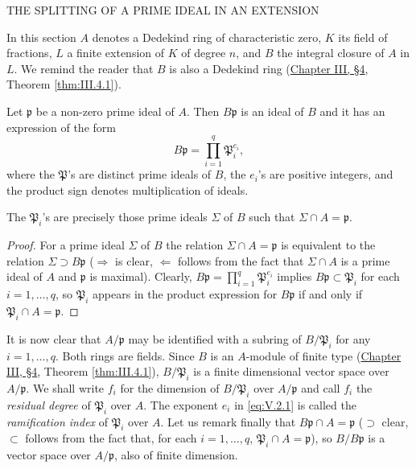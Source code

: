 %
        {THE SPLITTING OF A PRIME IDEAL IN AN EXTENSION}

In this section $A$ denotes a Dedekind ring of characteristic zero, $K$ its
field of fractions, $L$ a finite extension of $K$ of degree $n$, and $B$ the
integral closure of $A$ in $L$. We remind the reader that $B$ is also a
Dedekind ring (\hyperref[sec:3.4]{Chapter III, §4}, Theorem \ref{thm:III.4.1}).

Let $\mathfrak{p}$ be a non-zero prime ideal of $A$. Then
$B\mathfrak{p}$ is an ideal of $B$ and it has an expression of the form
\begin{equation}
B\mathfrak{p}=\prod_{i=1}^{q}\mathfrak{P}_{i}^{e_{i}},
\label{eq:V.2.1}
\end{equation}
where the $\mathfrak{P}$'s are distinct prime ideals of $B$, the $e_{i}$'s
are positive integers, and the product sign denotes multiplication of
ideals.

\begin{proposition}
\label{prop:V.2.1}
The $\mathfrak{P}_{i}$'s are precisely those prime ideals $\Sigma$ of $B$
such that $\Sigma\cap A=\mathfrak{p}$.
\end{proposition}

\begin{proof}
For a prime ideal $\Sigma$ of $B$ the relation $\Sigma\cap A=\mathfrak{p}$
is equivalent to the relation $\Sigma\supset B\mathfrak{p}$
($\Rightarrow$ is clear, $\Leftarrow$ follows from the fact that
$\Sigma\cap A$ is a prime ideal of $A$ and $\mathfrak{p}$ is maximal).
Clearly, $B\mathfrak{p}=\prod_{i=1}^{q}\mathfrak{P}_{i}^{e_{i}}$ implies
$B\mathfrak{p}\subset\mathfrak{P}_{i}$ for each $i=1,\ldots,q$, so
$\mathfrak{P}_{i}$ appears in the product expression for $B\mathfrak{p}$ if
and only if $\mathfrak{P}_{i}\cap A=\mathfrak{p}$.
\end{proof}

It is now clear that $A/\mathfrak{p}$ may be identified with a subring of
$B/\mathfrak{P}_{i}$ for any $i=1,\ldots,q$. Both rings are fields. Since $B$
is an $A$-module of finite type (\hyperref[sec:3.4]{Chapter III, §4}, Theorem
\ref{thm:III.4.1}), $B/\mathfrak{P}_{i}$ is a finite dimensional vector
space over $A/\mathfrak{p}$. We shall write $f_{i}$ for the dimension of
$B/\mathfrak{P}_{i}$ over $A/\mathfrak{p}$ and call $f_{i}$ the
\emph{residual degree} of $\mathfrak{P}_{i}$ over $A$. The exponent $e_{i}$
in \eqref{eq:V.2.1} is called the \emph{ramification index} of
$\mathfrak{P}_{i}$ over $A$. Let us remark finally that
$B\mathfrak{p}\cap A=\mathfrak{p}$ ($\supset$ clear, $\subset$ follows from
the fact that, for each $i=1,\ldots,q$,
$\mathfrak{P}_{i}\cap A=\mathfrak{p}$), so $B/B\mathfrak{p}$ is a vector
space over $A/\mathfrak{p}$, also of finite dimension.

